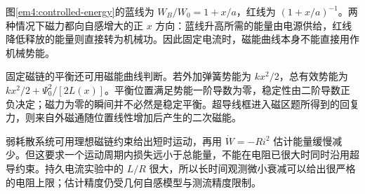 图\ref{em4:controlled-energy}的蓝线为 $W_B/W_0=1+x/a$，红线为 $(1+x/a)^{-1}$。两种情况下磁力都向自感增大的正 $x$ 方向：蓝线升高所需的能量由电源供给，红线降低释放的能量则直接转为机械功。因此固定电流时，磁能曲线本身不能直接用作机械势能。


固定磁链的平衡还可用磁能曲线判断。若外加弹簧势能为 $kx^2/2$，总有效势能为 $kx^2/2+\Psi_0^2/[2L(x)]$。平衡位置满足势能一阶导数为零，稳定性由二阶导数正负决定；磁力为零的瞬间并不必然是稳定平衡。超导线框进入磁区题所得到的回复力，则来自外磁通随位置线性增加后产生的二次磁能。

弱耗散系统可用理想磁链约束给出短时运动，再用 $\dot W=-Ri^2$ 估计能量缓慢减少。但这要求一个运动周期内损失远小于总能量，不能在电阻已很大时同时沿用超导约束。持久电流实验中的 $L/R$ 很大，所以长时间观测微小衰减可以给出很严格的电阻上限；估计精度仍受几何自感模型与测流精度限制。

